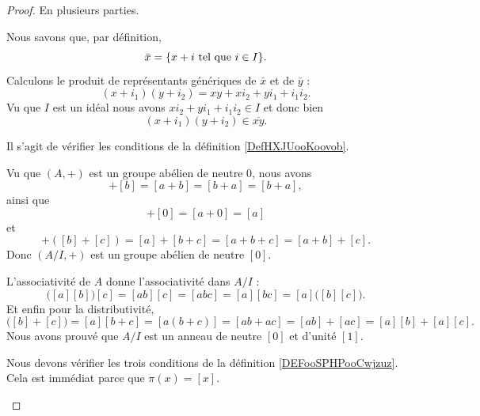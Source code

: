 \begin{proof}
    En plusieurs parties.
    \begin{subproof}
        \item[Pour \ref{ITEMooEJPEooRKAqmS}]
            Nous savons que, par définition,
            \begin{equation}
                \bar x=\{ x+i\text{ tel que } i\in I \}.
            \end{equation}
            Calculons le produit de représentants génériques de \( \bar x\) et de \( \bar y\) :
            \begin{equation}
                (x+i_1)(y+i_2)=xy+xi_2+yi_1+i_1i_2.
            \end{equation}
            Vu que \( I\) est un idéal nous avons \( xi_2+yi_1+i_1i_2\in I\) et donc bien
            \begin{equation}
                (x+i_1)(y+i_2)\in \overline{ xy }.
            \end{equation}
        \item[Pour \ref{ITEMooYBEGooTlHgNz}]
            Il s'agit de vérifier les conditions de la définition \ref{DefHXJUooKoovob}.

            Vu que \( (A,+)\) est un groupe abélien de neutre \( 0\), nous avons
            \begin{equation}
                [a]+[b]=[a+b]=[b+a]=[b+a],
            \end{equation}
            ainsi que
            \begin{equation}
                [a]+[0]=[a+0]=[a]
            \end{equation}
            et
            \begin{equation}
                [a]+([b]+[c])=[a]+[b+c]=[a+b+c]=[a+b]+[c].
            \end{equation}
            Donc \( (A/I,+)\) est un groupe abélien de neutre \( [0]\).

            L'associativité de \( A\) donne l'associativité dans \( A/I\) :
            \begin{equation}
                \big( [a][b] \big)[c]=[ab][c]=[abc]=[a][bc]=[a]\big( [b][c] \big).
            \end{equation}
            Et enfin pour la distributivité,
            \begin{equation}
                [a]\big( [b]+[c] \big)=[a][b+c]=[a(b+c)]=[ab+ac]=[ab]+[ac]=[a][b]+[a][c].
            \end{equation}
            Nous avons prouvé que \( A/I\) est un anneau de neutre \( [0]\) et d'unité \( [1]\).
        \item[Pour \ref{ITEMooLNRLooMkoWXZ}]
            Nous devons vérifier les trois conditions de la définition \ref{DEFooSPHPooCwjzuz}. Cela est immédiat parce que \( \pi(x)=[x]\).
    \end{subproof}
\end{proof}

